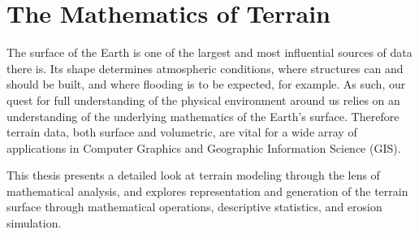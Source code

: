 \chapter {The Mathematics of Terrain}
\label{chapter:Introduction}

The surface of the Earth is one of the largest and most influential sources of data there is. 
Its shape determines atmospheric conditions, where structures can and should be built, and where flooding is to be expected, for example. 
As such, our quest for full understanding of the physical environment around us relies on an understanding of the underlying mathematics of the Earth's surface.
Therefore terrain data, both surface and volumetric, are vital for a wide array of applications in Computer Graphics and Geographic Information Science (GIS).

% 
This thesis presents a detailed look at terrain modeling through the lens of mathematical analysis, and explores representation and generation of the terrain surface 
through mathematical operations, descriptive statistics, and erosion simulation.





